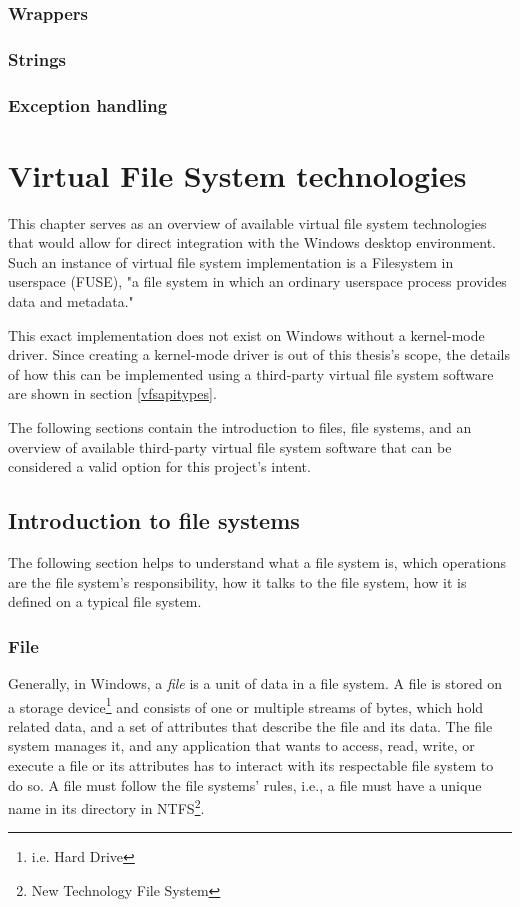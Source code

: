 \subsection{Wrappers}

\subsection{Strings}

\subsection{Exception handling}


\chapter{Virtual File System technologies}
\label{ch3}
This chapter serves as an overview of available virtual file system technologies that would allow for direct integration with the Windows desktop environment. Such an instance of virtual file system implementation is a Filesystem in userspace (FUSE), "a file system in which an ordinary userspace process provides data and metadata."\cite{FUSE}

This exact implementation does not exist on Windows without a kernel-mode driver\cite{WinKernelFS}. Since creating a kernel-mode driver is out of this thesis's scope, the details of how this can be implemented using a third-party virtual file system software are shown in section \ref{vfsapitypes}.

The following sections contain the introduction to files, file systems, and an overview of available third-party virtual file system software that can be considered a valid option for this project's intent.

\section{Introduction to file systems}
The following section helps to understand what a file system is, which operations are the file system's responsibility, how it talks to the file system, how it is defined on a typical file system.

\subsection{File}
\label{file}
Generally, in Windows, a \textit{file} is a unit of data in a file system. A file is stored on a storage device\footnote{i.e. Hard Drive} and consists of one or multiple streams of bytes, which hold related data, and a set of attributes that describe the file and its data. The file system manages it, and any application that wants to access, read, write, or execute a file or its attributes has to interact with its respectable file system to do so. A file must follow the file systems' rules, i.e., a file must have a unique name in its directory in NTFS\footnote{New Technology File System}.\cite{FilesAndClusters}

